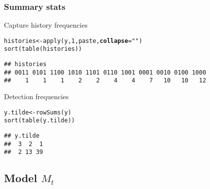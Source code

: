 \documentclass[color=usenames,dvipsnames]{beamer}\usepackage[]{graphicx}\usepackage[]{color}
\makeatletter
\newcommand{\hlnum}[1]{\textcolor[rgb]{0.69,0.494,0}{#1}}%
\newcommand{\hlstr}[1]{\textcolor[rgb]{0.749,0.012,0.012}{#1}}%
\newcommand{\hlstd}[1]{\textcolor[rgb]{0,0,0}{#1}}%
\newcommand{\hlkwb}[1]{\textcolor[rgb]{0,0.341,0.682}{#1}}%
\newcommand{\hlkwc}[1]{\textcolor[rgb]{0,0,0}{\textbf{#1}}}%
\newcommand{\hlkwd}[1]{\textcolor[rgb]{0.004,0.004,0.506}{#1}}%
\newenvironment{kframe}{%
 \def\at@end@of@kframe{}%
 \ifinner\ifhmode%
  \def\at@end@of@kframe{\end{minipage}}%
  \begin{minipage}{\columnwidth}%
 \fi\fi%
 \def\FrameCommand##1{\hskip\@totalleftmargin \hskip-\fboxsep
 \colorbox{shadecolor}{##1}\hskip-\fboxsep
     \hskip-\linewidth \hskip-\@totalleftmargin \hskip\columnwidth}%
 \MakeFramed {\advance\hsize-\width
   \@totalleftmargin\z@ \linewidth\hsize
   \@setminipage}}%
 {\par\unskip\endMakeFramed%
 \at@end@of@kframe}
\newenvironment{knitrout}{}{} %
\makeatother
\begin{document}
\begin{frame}[fragile]
  \frametitle{Summary stats}
  Capture history frequencies
\begin{knitrout}\scriptsize
{}\color{fgcolor}\begin{kframe}
\begin{alltt}
\hlstd{histories} \hlkwb{<-} \hlkwd{apply}\hlstd{(y,} \hlnum{1}\hlstd{, paste,} \hlkwc{collapse}\hlstd{=}\hlstr{""}\hlstd{)}
\hlkwd{sort}\hlstd{(}\hlkwd{table}\hlstd{(histories))}
\end{alltt}
\begin{verbatim}
## histories
## 0011 0101 1100 1010 1101 0110 1001 0001 0010 0100 1000 
##    1    1    1    2    2    4    4    7   10   10   12
\end{verbatim}
\end{kframe}
\end{knitrout}
\pause
\vfill
  Detection frequencies
\begin{knitrout}\scriptsize
{}\color{fgcolor}\begin{kframe}
\begin{alltt}
\hlstd{y.tilde} \hlkwb{<-} \hlkwd{rowSums}\hlstd{(y)}
\hlkwd{sort}\hlstd{(}\hlkwd{table}\hlstd{(y.tilde))}
\end{alltt}
\begin{verbatim}
## y.tilde
##  3  2  1 
##  2 13 39
\end{verbatim}
\end{kframe}
\end{knitrout}
\end{frame}



\subsection{Model $M_t$}
\end{document}
